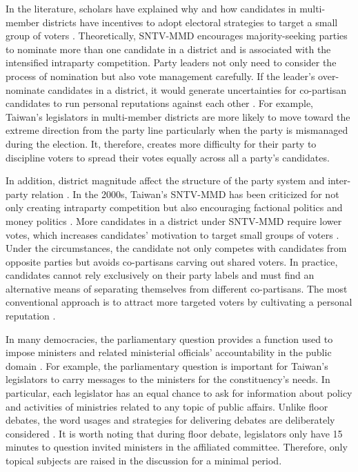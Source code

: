 In the literature, scholars have explained why and how candidates in multi-member districts have incentives to adopt electoral strategies to target a small group of voters \citep{Cox1990, Downs1957, Myerson1993}. Theoretically, SNTV-MMD encourages majority-seeking parties to nominate more than one candidate in a district \citep{Shugart2003} and is associated with the intensified intraparty competition. Party leaders not only need to consider the process of nomination but also vote management carefully. If the leader's over-nominate candidates in a district, it would generate uncertainties for co-partisan candidates to run personal reputations against each other \citep{Shugart2003, Cox1990}. For example, Taiwan's legislators in multi-member districts are more likely to move toward the extreme direction from the party line particularly when the party is mismanaged during the election\citep{Jang2019}. It, therefore, creates more difficulty for their party to discipline voters to spread their votes equally across all a party's candidates. 

In addition, district magnitude affect the structure of the party system and inter-party relation \citep{Duverger1954}. In the 2000s, Taiwan's SNTV-MMD has been criticized for not only creating intraparty competition \citep[e.g.,][]{Hirano2006}  but also encouraging factional politics and money politics \citep{Cox1996, Cox1994, Batto2016, Wu2003, Richardson1988}. More candidates in a district under SNTV-MMD require lower votes, which increases candidates' motivation to target small groups of voters \citep{Downs1957, Myerson1993}. Under the circumstances, the candidate not only competes with candidates from opposite parties but avoids co-partisans carving out shared voters. In practice, candidates cannot rely exclusively on their party labels and must find an alternative means of separating themselves from different co-partisans. The most conventional approach is to attract more targeted voters by cultivating a personal reputation \citep{Cain1987, Reed1994}.

In many democracies, the parliamentary question provides a function used to impose ministers and related ministerial officials' accountability in the public domain \citep{Martin2017}. For example, the parliamentary question is important for Taiwan's legislators to carry messages to the ministers for the constituency's needs. In particular, each legislator has an equal chance to ask for information about policy and activities of ministries related to any topic of public affairs. Unlike floor debates, the word usages and strategies for delivering debates are deliberately considered \citep[][]{Slapin2014, Slapin2018}. It is worth noting that during floor debate, legislators only have 15 minutes to question invited ministers in the affiliated committee. Therefore, only topical subjects are raised in the discussion for a minimal period. 

